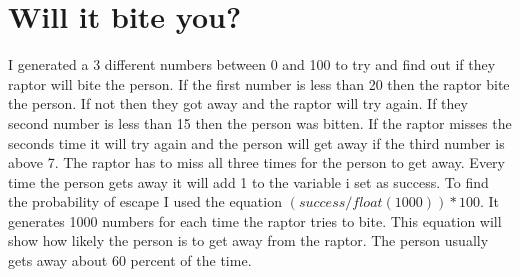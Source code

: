 \documentclass[twocolumn]{revtex4}
\begin{document}
\section{Will it bite you?}
I generated a 3 different numbers between 0 and 100 to try and find out if they raptor will bite the person. If the first number is less than 20 then the raptor bite the person. If not then they got away and the raptor will try again. If they second number is less than 15 then the person was bitten. If the raptor misses the seconds time it will try again and the person will get away if the third number is above 7. The raptor has to miss all three times for the person to get away. Every time the person gets away it will add 1 to the variable i set as success. To find the probability of escape I used the equation $(success/float(1000))*100$. It generates 1000 numbers for each time the raptor tries to bite. This equation will show how likely the person is to get away from the raptor. The person usually gets away about 60 percent of the time.
\end{document}
